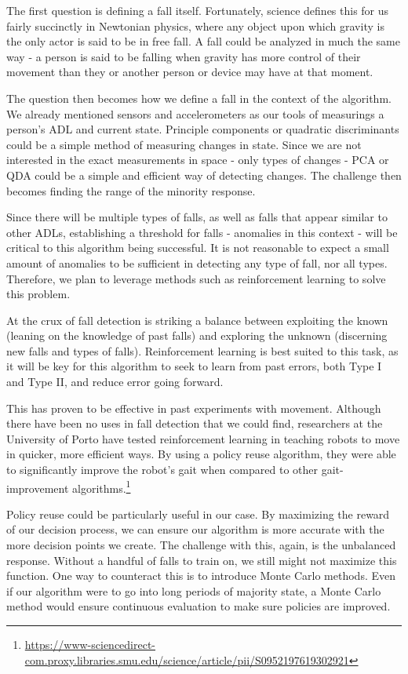 \documentclass{llncs}
\begin{document}
	The first question is defining a fall itself. Fortunately, science defines this for us fairly succinctly in Newtonian physics, where any object upon which gravity is the only actor is said to be in free fall. A fall could be analyzed in much the same way - a person is said to be falling when gravity has more control of their movement than they or another person or device may have at that moment.
	
	The question then becomes how we define a fall in the context of the algorithm. We already mentioned sensors and accelerometers as our tools of measurings a person's ADL and current state. Principle components or quadratic discriminants could be a simple method of measuring changes in state. Since we are not interested in the exact measurements in space - only types of changes - PCA or QDA could be a simple and efficient way of detecting changes. The challenge then becomes finding the range of the minority response.
	
	Since there will be multiple types of falls, as well as falls that appear similar to other ADLs, establishing a threshold for falls - anomalies in this context - will be critical to this algorithm being successful. It is not reasonable to expect a small amount of anomalies to be sufficient in detecting any type of fall, nor all types. Therefore, we plan to leverage methods such as reinforcement learning to solve this problem.
	
	At the crux of fall detection is striking a balance between exploiting the known (leaning on the knowledge of past falls) and exploring the unknown (discerning new falls and types of falls). Reinforcement learning is best suited to this task, as it will be key for this algorithm to seek to learn from past errors, both Type I and Type II, and reduce error going forward.
	
	This has proven to be effective in past experiments with movement. Although there have been no uses in fall detection that we could find, researchers at the University of Porto have tested reinforcement learning in teaching robots to move in quicker, more efficient ways. By using a policy reuse algorithm, they were able to significantly improve the robot's gait when compared to other gait-improvement algorithms.\footnote{\url{https://www-sciencedirect-com.proxy.libraries.smu.edu/science/article/pii/S0952197619302921}}
	
	Policy reuse could be particularly useful in our case. By maximizing the reward of our decision process, we can ensure our algorithm is more accurate with the more decision points we create. The challenge with this, again, is the unbalanced response. Without a handful of falls to train on, we still might not maximize this function. One way to counteract this is to introduce Monte Carlo methods. Even if our algorithm were to go into long periods of majority state, a Monte Carlo method would ensure continuous evaluation to make sure policies are improved.
	
\end{document}
